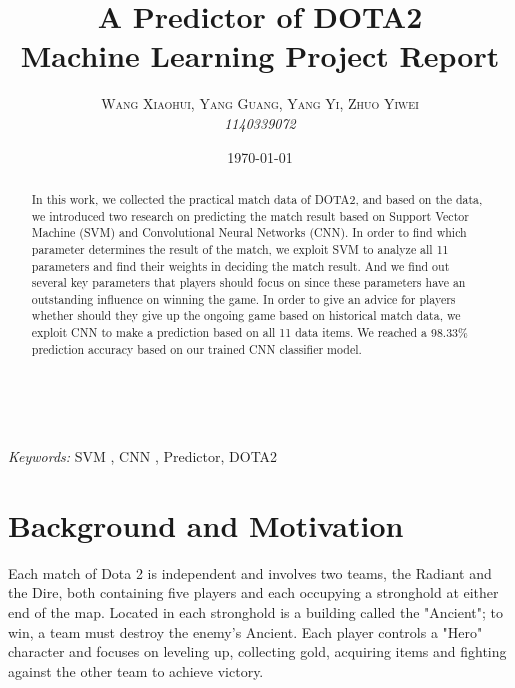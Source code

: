 \documentclass[a4paper, 11pt]{article} %
\title{\textbf{A Predictor of DOTA2}\\ %
Machine Learning Project Report} %
\author{\textsc{Wang Xiaohui, Yang Guang, Yang Yi, Zhuo Yiwei} %
\\{\textit{1140339072}}} %
\date{\today} %
\makeatletter
\renewcommand{\maketitle}{ %
\begin{flushright} %
{\LARGE\@title} %

\vspace{50pt} %

{\large\@author} %
\\\@date %

\vspace{40pt} %
\end{flushright}
}
\makeatother
\begin{document}
\maketitle %



\begin{abstract}
In this work, we collected the practical match data of DOTA2, and based on the data, we introduced two research on predicting the match result based on Support Vector Machine (SVM) and Convolutional Neural Networks (CNN). In order to find which parameter determines the result of the match, we exploit SVM to analyze all 11 parameters and find their weights in deciding the match result. And we find out several key parameters that players should focus on since these parameters have an outstanding influence on winning the game. In order to give an advice for players whether should they give up the ongoing game based on historical match data, we exploit CNN to make a prediction based on all 11 data items. We reached a 98.33\% prediction accuracy based on our trained CNN classifier model. 
\end{abstract}

\hspace*{3,6mm}\textit{Keywords:} SVM , CNN , Predictor, DOTA2 %

\vspace{30pt} %


\section{Background and Motivation}
Each match of Dota 2 is independent and involves two teams, the Radiant and the Dire, both containing five players and each occupying a stronghold at either end of the map. Located in each stronghold is a building called the "Ancient"; to win, a team must destroy the enemy's Ancient. Each player controls a "Hero" character and focuses on leveling up, collecting gold, acquiring items and fighting against the other team to achieve victory.
\end{document}
